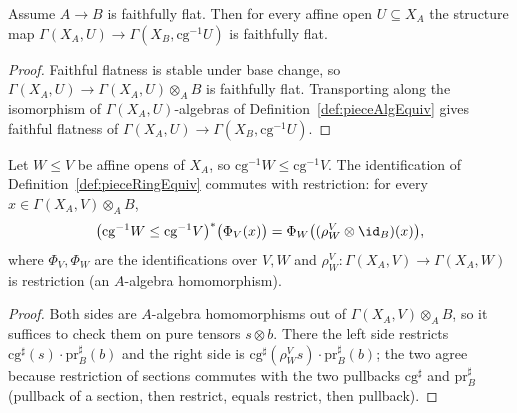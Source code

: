 \begin{theorem}
  \label{thm:faithfullyFlat_pieceCover}
  \leanok
  Assume \(A \to B\) is faithfully flat. Then for every affine open \(U \subseteq X_A\) the
  structure map \(\Gamma(X_A, U) \to \Gamma(X_B, \mathrm{cg}^{-1}U)\) is faithfully flat.
\end{theorem}
\begin{proof}
  \leanok
  Faithful flatness is stable under base change, so \(\Gamma(X_A, U) \to \Gamma(X_A, U)
  \otimes_A B\) is faithfully flat. Transporting along the isomorphism of \(\Gamma(X_A,
  U)\)-algebras of Definition~\ref{def:pieceAlgEquiv} gives faithful flatness of \(\Gamma(X_A, U)
  \to \Gamma(X_B, \mathrm{cg}^{-1}U)\).
\end{proof}

\begin{theorem}
  \label{thm:pieceRingEquiv_naturality}
  \leanok
  Let \(W \le V\) be affine opens of \(X_A\), so \(\mathrm{cg}^{-1}W \le \mathrm{cg}^{-1}V\). The
  identification of Definition~\ref{def:pieceRingEquiv} commutes with restriction: for every \(x
  \in \Gamma(X_A, V) \otimes_A B\),
  \[
    \bigl(\mathrm{cg}^{-1}W \le \mathrm{cg}^{-1}V\bigr)^{*}\bigl(\Phi_V(x)\bigr)
      = \Phi_W\bigl((\rho^{V}_{W} \otimes \id_B)(x)\bigr),
  \]
  where \(\Phi_V, \Phi_W\) are the identifications over \(V, W\) and \(\rho^{V}_{W} \colon
  \Gamma(X_A, V) \to \Gamma(X_A, W)\) is restriction (an \(A\)-algebra homomorphism).
\end{theorem}
\begin{proof}
  \leanok
  Both sides are \(A\)-algebra homomorphisms out of \(\Gamma(X_A, V) \otimes_A B\), so it
  suffices to check them on pure tensors \(s \otimes b\). There the left side restricts
  \(\mathrm{cg}^{\sharp}(s)\cdot \mathrm{pr}_B^{\sharp}(b)\) and the right side is
  \(\mathrm{cg}^{\sharp}(\rho^{V}_{W} s)\cdot \mathrm{pr}_B^{\sharp}(b)\); the two agree because
  restriction of sections commutes with the two pullbacks \(\mathrm{cg}^{\sharp}\) and
  \(\mathrm{pr}_B^{\sharp}\) (pullback of a section, then restrict, equals restrict, then
  pullback).
\end{proof}

